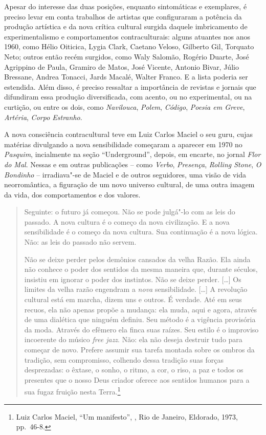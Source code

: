 Apesar do interesse das duas posições, enquanto sintomáticas e
exemplares, é preciso levar em conta trabalhos de artistas que
configuraram a potência da produção artística e da nova crítica cultural
surgida daquele imbricamento de experimentalismo e comportamentos
contraculturais: alguns atuantes nos anos 1960, como Hélio Oiticica,
Lygia Clark, Caetano Veloso, Gilberto Gil, Torquato Neto; outros então
recém surgidos, como Waly Salomão, Rogério Duarte, José Agrippino de
Paula, Gramiro de Matos, José Vicente, Antonio Bivar, Júlio Bressane,
Andrea Tonacci, Jards Macalé, Walter Franco. E a lista poderia ser
estendida. Além disso, é preciso ressaltar a importância de revistas e
jornais que difundiram essa produção diversificada, com acento, ou no
experimental, ou na curtição, ou entre os dois, como \emph{Navilouca},
\emph{Polem}, \emph{Código}, \emph{Poesia em Greve}, \emph{Artéria},
\emph{Corpo Estranho}.

\asterisc

A nova consciência contracultural teve em Luiz Carlos Maciel o seu guru,
cujas matérias divulgando a nova sensibilidade começaram a aparecer em
1970 no \emph{Pasquim}, incialmente na seção ``Underground'', depois, em
encarte, no jornal \emph{Flor do Mal}. Nessas e em outras publicações --
como \emph{Verbo}, \emph{Presença}, \emph{Rolling Stone}, \emph{O
Bondinho} -- irradiava"-se de Maciel e de outros seguidores, uma
visão de vida neorromântica, a figuração de um novo universo cultural,
de uma outra imagem da vida, dos comportamentos e dos valores.

\begin{quote}
Seguinte: o futuro já começou. Não se pode julgá"-lo com as leis do
passado. A nova cultura é o começo da nova civilização. E a nova
sensibilidade é o começo da nova cultura. Sua continuação é a nova
lógica. Não: as leis do passado não servem.

Não se deixe perder pelos demônios cansados da velha Razão. Ela ainda
não conhece o poder dos sentidos da mesma maneira que, durante séculos,
insistiu em ignorar o poder dos instintos. Não se deixe perder.
{[}\ldots{}{]} Os limites da velha razão engendram a \emph{nova}
sensibilidade. {[}\ldots{}{]} A revolução cultural está em marcha, dizem uns
e outros. É verdade. Até em seus recuos, ela não apenas propõe a
mudança: ela muda, aqui e agora, através de uma dialética que ninguém
definiu. Seu método é a vigência provisória da moda. Através do efêmero
ela finca suas raízes. Seu estilo é o improviso incoerente do músico
\emph{free jazz}. Não: ela não deseja destruir tudo para começar de
novo. Prefere assumir sua tarefa montada sobre os ombros da tradição,
sem compromisso, colhendo dessa tradição suas forças desprezadas: o
êxtase, o sonho, o ritmo, a cor, o riso, a paz e todos os presentes que
o nosso Deus criador oferece aos sentidos humanos para a sua fugaz
fruição nesta Terra.\footnote{Luiz Carlos Maciel, ``Um manifesto'',
{}, Rio de Janeiro, Eldorado, 1973, pp.~46-8.}
\end{quote}

